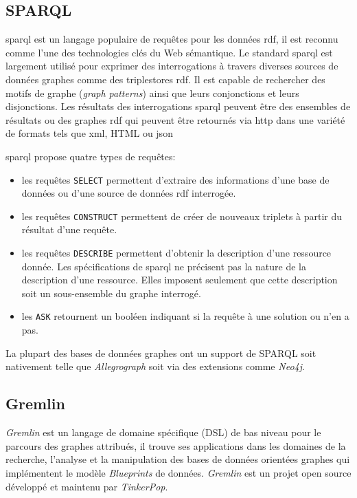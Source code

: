   \subsection{SPARQL}
  \label{sec:sparql}
  \acrshort{sparql} \cite{prud2008sparql} est un langage populaire de
  requêtes pour les données \acrshort{rdf}, il est reconnu comme l'une
  des technologies clés du Web sémantique. Le standard
  \acrshort{sparql} est largement utilisé pour exprimer des
  interrogations à travers diverses sources de données graphes comme
  des triplestores \acrshort{rdf}. Il est capable de rechercher des
  motifs de graphe (\emph{graph patterns}) ainsi que leurs
  conjonctions et leurs disjonctions. Les résultats des interrogations
  \acrshort{sparql} peuvent être des ensembles de résultats ou des
  graphes \acrshort{rdf} qui peuvent être retournés via
  \acrshort{http} dans une variété de formats tels que \acrshort{xml},
  HTML ou \acrshort{json}\medskip

  \acrshort{sparql} propose quatre types de requêtes:\medskip

  \begin{itemize}\renewcommand\labelitemi{--}
  \item les requêtes \texttt{SELECT} permettent d'extraire des
    informations d'une base de données ou d'une source de données
    \acrshort{rdf} interrogée.
  \item les requêtes \texttt{CONSTRUCT} permettent de créer de
    nouveaux triplets à partir du résultat d'une requête.

  \item les requêtes \texttt{DESCRIBE} permettent d'obtenir la
    description d'une ressource donnée. Les spécifications de
    \acrshort{sparql} ne précisent pas la nature de la description
    d'une ressource. Elles imposent seulement que cette description
    soit un sous-ensemble du graphe interrogé.

  \item les \texttt{ASK} retournent un booléen indiquant si la requête
    à une solution ou n'en a pas.
  \end{itemize}
  \enddescription
  \medskip

  La plupart des bases de données graphes ont un support de
  \textsc{SPARQL} soit nativement telle que \emph{Allegrograph} soit
  via des extensions comme \emph{Neo4j}.

  \subsection{Gremlin}
  \label{sec:gremlin}
  \emph{Gremlin} \cite{gremlin-wiki} est un langage de domaine
  spécifique (\acrshort{DSL}) de bas niveau pour le parcours des
  graphes attribués, il trouve ses applications dans les domaines de
  la recherche, l'analyse et la manipulation des bases de données
  orientées graphes qui implémentent le modèle \emph{Blueprints}
  \cite{blueprints} de données. \emph{Gremlin} \cite{gremlin-wiki} est
  un projet open source développé et maintenu par
  \emph{TinkerPop}.\medskip

